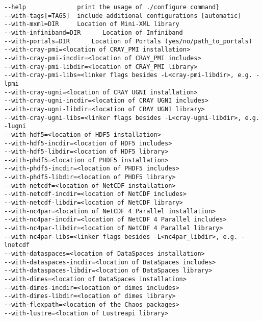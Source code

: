 \begin{lstlisting}
--help              print the usage of ./configure command}
--with-tags[=TAGS]  include additional configurations [automatic]
--with-mxml=DIR     Location of Mini-XML library
--with-infiniband=DIR      Location of Infiniband
--with-portals=DIR      Location of Portals (yes/no/path_to_portals)
--with-cray-pmi=<location of CRAY_PMI installation>
--with-cray-pmi-incdir=<location of CRAY_PMI includes>
--with-cray-pmi-libdir=<location of CRAY_PMI library>
--with-cray-pmi-libs=<linker flags besides -L<cray-pmi-libdir>, e.g. -lpmi
--with-cray-ugni=<location of CRAY UGNI installation>
--with-cray-ugni-incdir=<location of CRAY UGNI includes>
--with-cray-ugni-libdir=<location of CRAY UGNI library>
--with-cray-ugni-libs=<linker flags besides -L<cray-ugni-libdir>, e.g. -lugni
--with-hdf5=<location of HDF5 installation>
--with-hdf5-incdir=<location of HDF5 includes>
--with-hdf5-libdir=<location of HDF5 library>
--with-phdf5=<location of PHDF5 installation>
--with-phdf5-incdir=<location of PHDF5 includes>
--with-phdf5-libdir=<location of PHDF5 library>
--with-netcdf=<location of NetCDF installation>
--with-netcdf-incdir=<location of NetCDF includes>
--with-netcdf-libdir=<location of NetCDF library>
--with-nc4par=<location of NetCDF 4 Parallel installation>
--with-nc4par-incdir=<location of NetCDF 4 Parallel includes>
--with-nc4par-libdir=<location of NetCDF 4 Parallel library>
--with-nc4par-libs=<linker flags besides -L<nc4par_libdir>, e.g. -lnetcdf
--with-dataspaces=<location of DataSpaces installation>
--with-dataspaces-incdir=<location of DataSpaces includes>
--with-dataspaces-libdir=<location of DataSpaces library>
--with-dimes=<location of DataSpaces installation>
--with-dimes-incdir=<location of dimes includes>
--with-dimes-libdir=<location of dimes library>
--with-flexpath=<location of the Chaos packages>
--with-lustre=<location of Lustreapi library>
\end{lstlisting}


